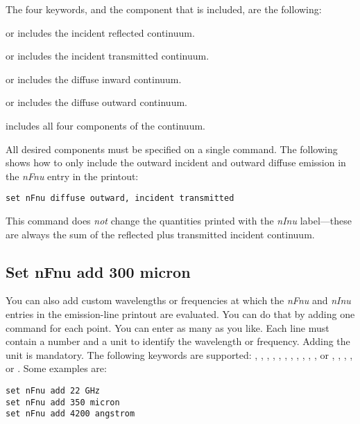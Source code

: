 The four keywords, and the component that is included, are the following:

  or  includes
the incident reflected continuum.

  or  includes
the incident transmitted continuum.

  or  includes the diffuse
inward continuum.

  or  includes the
diffuse outward continuum.

  includes all four components of the continuum.

All desired components must be specified on a single  command.
The following
shows how to only include the outward incident and outward diffuse emission
in the \emph{nFnu} entry in the printout:
\begin{verbatim}
set nFnu diffuse outward, incident transmitted
\end{verbatim}

This command
does {\em not} change the quantities printed with the \emph{nInu} label---these
are always the sum of the reflected plus transmitted incident continuum.

\subsection{Set nFnu add 300 micron}
\label{sec:set:nfnu:add}

You can also add custom wavelengths or frequencies at which the \emph{nFnu}
and \emph{nInu} entries in the emission-line printout are evaluated. You can
do that by adding one  command for each point. You can
enter as many as you like. Each line must contain a number and a unit to identify
the wavelength or frequency. Adding the unit is mandatory. The following keywords
are supported: , , ,
, , , ,
, , , ,
 or , 
, , ,  or
.
Some examples are:
\begin{verbatim}
set nFnu add 22 GHz
set nFnu add 350 micron
set nFnu add 4200 angstrom
\end{verbatim}

